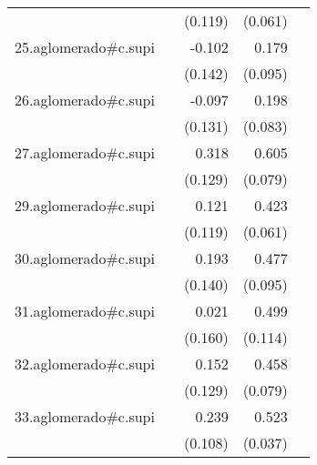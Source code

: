 {\begin{longtable}{l*{4}{D{.}{.}{-1}}}
            &                     &     (0.119)         &     (0.061)         &                     \\
\addlinespace
25.aglomerado#c.supi&                     &      -0.102         &       0.179         &                     \\
            &                     &     (0.142)         &     (0.095)         &                     \\
\addlinespace
26.aglomerado#c.supi&                     &      -0.097         &       0.198\sym{*}  &                     \\
            &                     &     (0.131)         &     (0.083)         &                     \\
\addlinespace
27.aglomerado#c.supi&                     &       0.318\sym{*}  &       0.605\sym{***}&                     \\
            &                     &     (0.129)         &     (0.079)         &                     \\
\addlinespace
29.aglomerado#c.supi&                     &       0.121         &       0.423\sym{***}&                     \\
            &                     &     (0.119)         &     (0.061)         &                     \\
\addlinespace
30.aglomerado#c.supi&                     &       0.193         &       0.477\sym{***}&                     \\
            &                     &     (0.140)         &     (0.095)         &                     \\
\addlinespace
31.aglomerado#c.supi&                     &       0.021         &       0.499\sym{***}&                     \\
            &                     &     (0.160)         &     (0.114)         &                     \\
\addlinespace
32.aglomerado#c.supi&                     &       0.152         &       0.458\sym{***}&                     \\
            &                     &     (0.129)         &     (0.079)         &                     \\
\addlinespace
33.aglomerado#c.supi&                     &       0.239\sym{*}  &       0.523\sym{***}&                     \\
            &                     &     (0.108)         &     (0.037)         &                     \\

\end{longtable}}

